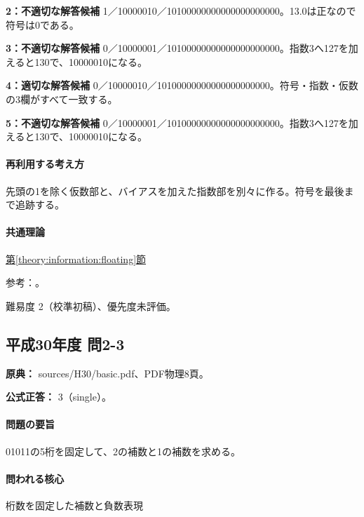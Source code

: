 \noindent\textbf{2：不適切な解答候補} 1／10000010／10100000000000000000000。13.0は正なので符号は0である。\par

\noindent\textbf{3：不適切な解答候補} 0／10000001／10100000000000000000000。指数3へ127を加えると130で、10000010になる。\par

\noindent\textbf{4：適切な解答候補} 0／10000010／10100000000000000000000。符号・指数・仮数の3欄がすべて一致する。\par

\noindent\textbf{5：不適切な解答候補} 0／10000001／10100000000000000000000。指数3へ127を加えると130で、10000010になる。\par

\paragraph{再利用する考え方} 先頭の1を除く仮数部と、バイアスを加えた指数部を別々に作る。符号を最後まで追跡する。

\paragraph{共通理論} \hyperref[theory:information:floating]{第\ref*{theory:information:floating}節}

\par 参考：\cite{oracle_single}。

\par 難易度 2（校準初稿）、優先度未評価。

\subsection{平成30年度 問2-3}
\label{q:h30-reg-basic-2-3}

\noindent\textbf{原典：} sources/H30/basic.pdf、PDF物理8頁。

\textbf{公式正答：} 3（single）。

\paragraph{問題の要旨} 01011の5桁を固定して、2の補数と1の補数を求める。

\paragraph{問われる核心} 桁数を固定した補数と負数表現

